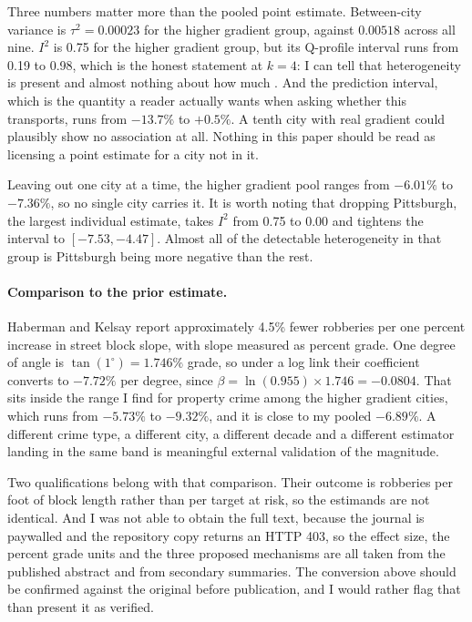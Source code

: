 \documentclass[10pt,letterpaper]{article}
\begin{document}
Three numbers matter more than the pooled point estimate. Between-city variance is
$\tau^2 = 0.00023$ for the higher gradient group, against $0.00518$ across all nine.
$I^2$ is 0.75 for the higher gradient group, but its Q-profile interval
\cite{viechtbauer2007} runs from 0.19 to 0.98, which is the honest statement at
$k=4$: I can tell that heterogeneity is present and almost nothing about how much
\cite{higgins2002}. And the prediction interval, which is the quantity a reader
actually wants when asking whether this transports, runs from $-13.7\%$ to
$+0.5\%$. A tenth city with real gradient could plausibly show no association at
all. Nothing in this paper should be read as licensing a point estimate for a city
not in it.

Leaving out one city at a time, the higher gradient pool ranges from $-6.01\%$ to
$-7.36\%$, so no single city carries it. It is worth noting that dropping
Pittsburgh, the largest individual estimate, takes $I^2$ from 0.75 to 0.00 and
tightens the interval to $[-7.53, -4.47]$. Almost all of the detectable
heterogeneity in that group is Pittsburgh being more negative than the rest.

\paragraph{Comparison to the prior estimate.} Haberman and Kelsay report approximately
4.5\% fewer robberies per one percent increase in street block slope, with slope
measured as percent grade. One degree of angle is $\tan(1^\circ) = 1.746\%$ grade, so
under a log link their coefficient converts to $-7.72\%$ per degree, since
$\beta = \ln(0.955) \times 1.746 = -0.0804$. That sits inside the range I find for
property crime among the higher gradient cities, which runs from $-5.73\%$ to
$-9.32\%$, and it is close to my pooled $-6.89\%$. A different crime type, a different
city, a different decade and a different estimator landing in the same band is
meaningful external validation of the magnitude.

Two qualifications belong with that comparison. Their outcome is robberies per foot of
block length rather than per target at risk, so the estimands are not identical. And I
was not able to obtain the full text, because the journal is paywalled and the
repository copy returns an HTTP 403, so the effect size, the percent grade units and
the three proposed mechanisms are all taken from the published abstract and from
secondary summaries. The conversion above should be confirmed against the original
before publication, and I would rather flag that than present it as verified.
\end{document}
